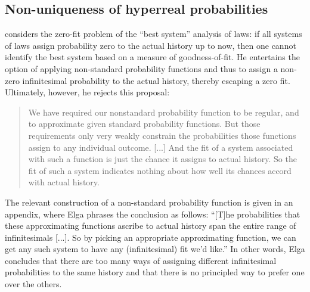 \subsection{Non-uniqueness of hyperreal probabilities}
\citet{Elga:2004} considers the zero-fit problem of the ``best system'' analysis of laws: if all systems of laws assign probability zero to the actual history up to now, then one cannot identify the best system based on a measure of goodness-of-fit. He entertains the option of applying non-standard probability functions and thus to assign a non-zero infinitesimal probability to the actual history, thereby escaping a zero fit. Ultimately, however, he rejects this proposal:
\begin{quote}
We have required our nonstandard probability function to be regular, and to approximate given standard probability functions. But those requirements only very weakly constrain the probabilities those functions assign to any individual outcome. [...] And the fit of a system associated with such a function is just the chance it assigns to actual history. So the fit of such a system indicates nothing about how well its chances accord with actual history.
\end{quote}
The relevant construction of a non-standard probability function is given in an appendix, where Elga phrases the conclusion as follows:
``[T]he probabilities that these approximating functions ascribe to actual history span the entire range of infinitesimals [...]. So by picking an appropriate approximating function, we can get any such system to have any (infinitesimal) fit we'd like.''
In other words, Elga concludes that there are too many ways of assigning different infinitesimal probabilities to the same history and that there is no principled way to prefer one over the others.

